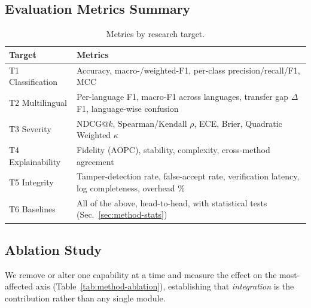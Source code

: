 \documentclass[11pt,a4paper]{article}
\begin{document}
\subsection{Evaluation Metrics Summary}\label{sec:method-metrics}
\begin{table}[t]
\centering
\caption{Metrics by research target.}
\label{tab:method-metrics}
\small
\renewcommand{\arraystretch}{1.15}
\begin{tabular}{@{}p{3.0cm}p{9.0cm}@{}}
\toprule
\textbf{Target} & \textbf{Metrics} \\
\midrule
T1 Classification & Accuracy, macro-/weighted-F1, per-class precision/recall/F1, MCC \\
T2 Multilingual   & Per-language F1, macro-F1 across languages, transfer gap $\Delta$F1, language-wise confusion \\
T3 Severity       & NDCG@$k$, Spearman/Kendall $\rho$, ECE, Brier, Quadratic Weighted $\kappa$ \\
T4 Explainability & Fidelity (AOPC), stability, complexity, cross-method agreement \\
T5 Integrity      & Tamper-detection rate, false-accept rate, verification latency, log completeness, overhead \% \\
T6 Baselines      & All of the above, head-to-head, with statistical tests (Sec.~\ref{sec:method-stats}) \\
\bottomrule
\end{tabular}
\end{table}

\subsection{Ablation Study}\label{sec:method-ablation}
We remove or alter one capability at a time and measure the effect on the most-affected
axis (Table~\ref{tab:method-ablation}), establishing that \emph{integration} is the
contribution rather than any single module.
\end{document}
